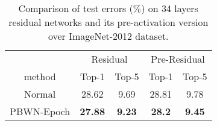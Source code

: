 \documentclass[twocolumn]{article}
\begin{document}
\begin{table}[t]
  \caption{Comparison of test errors ($\%$) on 34 layers residual networks and its pre-activation version over ImageNet-2012 dataset.}
  \label{table:ImageNet}
  \vspace{0.1in}
  \centering
  \begin{small}
  \begin{tabular}{c|cc|cc}
    \toprule
    & \multicolumn{2}{c|}{Residual} &    \multicolumn{2}{c}{Pre-Residual}   \\
    method   & Top-1    & Top-5  & Top-1   & Top-5 \\
  \hline
     Normal    & 28.62       &  9.69     &     28.81       & 9.78  \\
     PBWN-Epoch     & \textbf{27.88} & \textbf{9.23}   &\textbf{28.2 } & \textbf{9.45} \\
    \bottomrule
  \end{tabular}
\end{small}
  \vspace{-0.1in}
\end{table}
\end{document}
